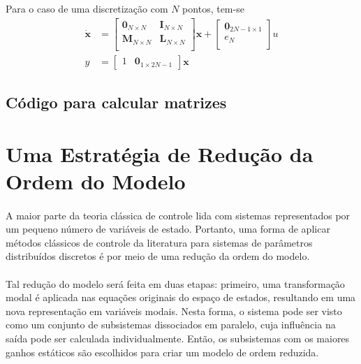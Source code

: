 \documentclass[a4paper,11pt]{scrartcl} %
\numberwithin{equation}{section} %
\numberwithin{figure}{section} %
\numberwithin{table}{section} %
\begin{document}
 Para o caso de uma discretização com $N$ pontos, tem-se \begin{align}
 	\mathbf{\dot{x}} &= \left[\begin{array}{cc}
	\mathbf{0}_{N\times N} & \mathbf{I}_{N\times N}\\
	\mathbf{M}_{N\times N} & \mathbf{L}_{N\times N}\\
\end{array}\right] \mathbf{x} + \left[\begin{array}{c}
	\mathbf{0}_{2N-1\times 1}\\ e_N\\
\end{array} \right]u\\
y &= \left[\begin{array}{cc}
	1 & \textbf{0}_{1\times 2N-1}
\end{array}\right]\textbf{x}
 \end{align}
 
 \subsection{Código para calcular matrizes}
%
%
% 



\section{Uma Estratégia de Redução da Ordem do Modelo}
\paragraph{} A maior parte da teoria clássica de controle lida com sistemas representados por um pequeno número de variáveis de estado. Portanto, uma forma de aplicar métodos clássicos de controle da literatura para sistemas de parâmetros distribuídos discretos é por meio de uma redução da ordem do modelo.

\paragraph{} Tal redução do modelo será feita em duas etapas: primeiro, uma transformação modal é aplicada nas equações originais do espaço de estados, resultando em uma nova representação em variáveis modais. Nesta forma, o sistema pode ser visto como um conjunto de subsistemas dissociados em paralelo, cuja influência na saída pode ser calculada individualmente. Então, os subsistemas com os maiores ganhos estáticos são escolhidos para criar um modelo de ordem reduzida.
\end{document}
